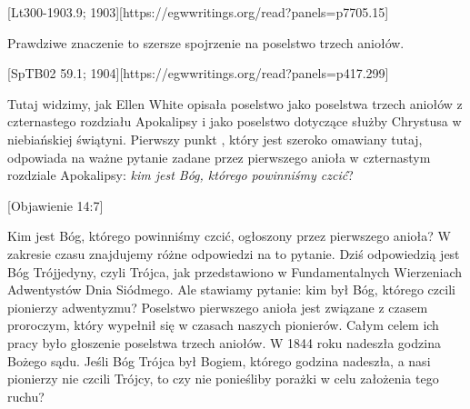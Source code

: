  \label{chap:remembering-the-beginning}

[Lt300-1903.9; 1903][https://egwwritings.org/read?panels=p7705.15]

Prawdziwe znaczenie  to szersze spojrzenie na poselstwo trzech aniołów.

[SpTB02 59.1; 1904][https://egwwritings.org/read?panels=p417.299]

Tutaj widzimy, jak Ellen White opisała poselstwo  jako poselstwa trzech aniołów z czternastego rozdziału Apokalipsy i jako poselstwo dotyczące służby Chrystusa w niebiańskiej świątyni. Pierwszy punkt , który jest szeroko omawiany tutaj, odpowiada na ważne pytanie zadane przez pierwszego anioła w czternastym rozdziale Apokalipsy: \textit{kim jest Bóg, którego powinniśmy czcić}?

[Objawienie 14:7]

Kim jest Bóg, którego powinniśmy czcić, ogłoszony przez pierwszego anioła? W zakresie czasu znajdujemy różne odpowiedzi na to pytanie. Dziś odpowiedzią jest Bóg Trójjedyny, czyli Trójca, jak przedstawiono w Fundamentalnych Wierzeniach Adwentystów Dnia Siódmego. Ale stawiamy pytanie: kim był Bóg, którego czcili pionierzy adwentyzmu? Poselstwo pierwszego anioła jest związane z czasem proroczym, który wypełnił się w czasach naszych pionierów. Całym celem ich pracy było głoszenie poselstwa trzech aniołów. W 1844 roku nadeszła godzina Bożego sądu. Jeśli Bóg Trójca był Bogiem, którego godzina nadeszła, a nasi pionierzy nie czcili Trójcy, to czy nie ponieśliby porażki w celu założenia tego ruchu?

